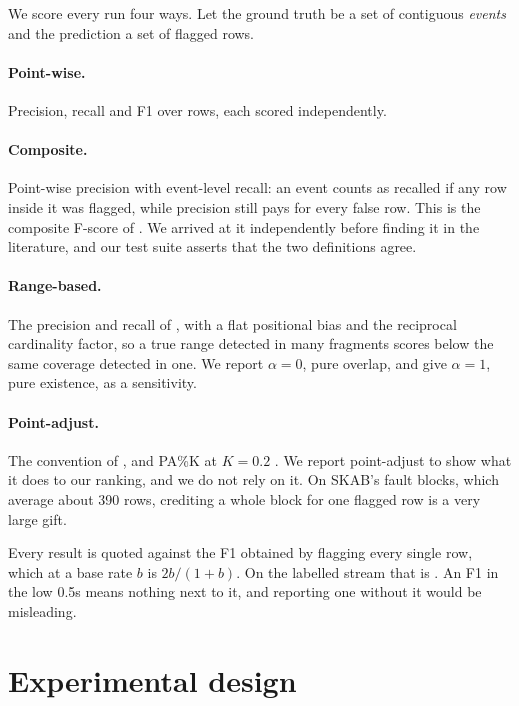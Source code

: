 \documentclass[11pt,a4paper]{article}
\begin{document}
We score every run four ways. Let the ground truth be a set of contiguous
\emph{events} and the prediction a set of flagged rows.

\paragraph{Point-wise.} Precision, recall and F1 over rows, each scored
independently.

\paragraph{Composite.} Point-wise precision with event-level recall: an event
counts as recalled if any row inside it was flagged, while precision still pays
for every false row. This is the composite F-score of
\citet{garg2021evaluation}. We arrived at it independently before finding it in
the literature, and our test suite asserts that the two definitions agree.

\paragraph{Range-based.} The precision and recall of \citet{tatbul2018range},
with a flat positional bias and the reciprocal cardinality factor, so a true
range detected in many fragments scores below the same coverage detected in one.
We report $\alpha = 0$, pure overlap, and give $\alpha = 1$, pure existence, as a
sensitivity.

\paragraph{Point-adjust.} The convention of \citet{xu2018donut}, and PA\%K at
$K=0.2$ \citep{kim2022rigorous}. We report point-adjust to show what it does to
our ranking, and we do not rely on it. On SKAB's fault blocks, which
average about 390 rows, crediting a whole block for one flagged row is a very
large gift.

Every result is quoted against the F1 obtained by flagging every single row,
which at a base rate $b$ is $2b/(1+b)$. On the labelled stream that is
\FlagAll{}. An F1 in the low 0.5s means nothing next to it, and reporting one
without it would be misleading.

\section{Experimental design}
\end{document}

